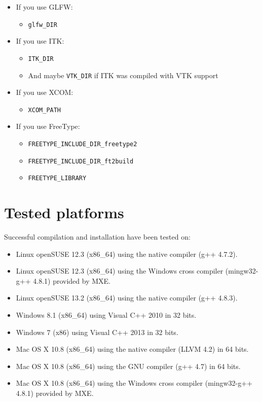 \documentclass[11pt,oneside,a4paper,final]{article}
\begin{document}
\begin{itemize}
	\item If you use GLFW:
	\begin{itemize}
		\item \verb|glfw_DIR|
	\end{itemize}

	\item If you use \Gls{ITK}:
	\begin{itemize}
		\item \verb|ITK_DIR|
		\item And maybe \verb|VTK_DIR| if \Gls{ITK} was compiled with \Gls{VTK} support
	\end{itemize}
	
	\item If you use XCOM:
	\begin{itemize}
		\item \verb|XCOM_PATH|
	\end{itemize}

	\item If you use FreeType:
	\begin{itemize}
		\item \verb|FREETYPE_INCLUDE_DIR_freetype2|
		\item \verb|FREETYPE_INCLUDE_DIR_ft2build|
		\item \verb|FREETYPE_LIBRARY|
	\end{itemize}


\end{itemize}


\section{Tested platforms}

Successful compilation and installation have been tested on:

\begin{itemize}
 \item Linux openSUSE 12.3 (x86\_64) using the native compiler (g++ 4.7.2).
 \item Linux openSUSE 12.3 (x86\_64) using the Windows cross compiler (mingw32-g++ 4.8.1) provided by \Gls{MXE}.
 \item Linux openSUSE 13.2 (x86\_64) using the native compiler (g++ 4.8.3).
 \item Windows 8.1 (x86\_64) using Visual C++ 2010 in 32 bits.
 \item Windows 7 (x86) using Visual C++ 2013 in 32 bits.
 \item Mac OS X 10.8 (x86\_64) using the native compiler (LLVM 4.2) in 64 bits.
 \item Mac OS X 10.8 (x86\_64) using the GNU compiler (g++ 4.7) in 64 bits.
 \item Mac OS X 10.8 (x86\_64) using the Windows cross compiler (mingw32-g++ 4.8.1) provided by \Gls{MXE}.
\end{itemize}


\newpage
\printglossary[type=\acronymtype] 

\newpage
{}
{}
\printbibliography
\end{document}
